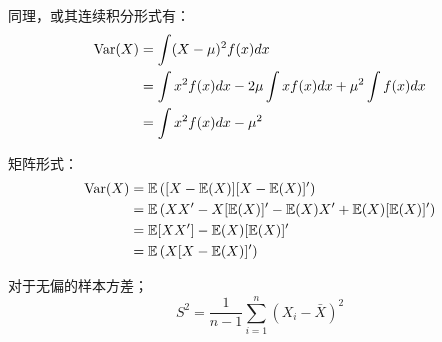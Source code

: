 \documentclass[11pt]{article}
\begin{document}
同理，或其连续积分形式有：
\begin{align*}
    \operatorname{Var}(X) &= \int (X-\mu)^2 f(x) dx \\
    &= \int x^2 f(x) dx - 2\mu \int xf(x)dx + \mu^2 \int f(x)dx \\
    &= \int x^2 f(x) dx - \mu^2
\end{align*}

矩阵形式：
\begin{align*}
    \operatorname{Var}(X) &= \mathbb{E}\left( [X -\mathbb{E}(X)][X-\mathbb{E}(X)]' \right) \\
    &= \mathbb{E}\left( XX' - X[\mathbb{E}(X)]' - \mathbb{E}(X)X' + \mathbb{E}(X)[\mathbb{E}(X)]' \right) \\
    &= \mathbb{E}[XX'] - \mathbb{E}(X)[\mathbb{E}(X)]' \\
    &= \mathbb{E}\left( X [X - \mathbb{E}(X)]' \right)
\end{align*}

对于无偏的样本方差；
\begin{equation*}
    S^2 = \frac{1}{n-1} \sum_{i=1}^{n} \left(X_i - \bar{X} \right)^2
\end{equation*}
\end{document}
